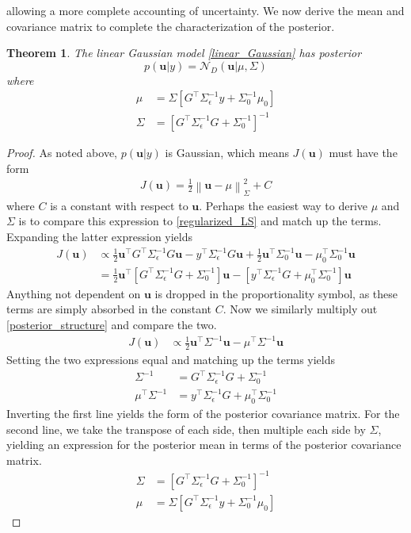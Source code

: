\documentclass[12pt]{article}
\newcommand{\bpar}{\mathbf{u}} %
\newcommand*{\norm}[1]{\left\lVert#1\right\rVert}
\newtheorem{thm}{Theorem}
\begin{document}
allowing a more complete accounting of uncertainty. We now derive the mean and covariance matrix to complete the characterization of the posterior. 
\begin{thm}
The linear Gaussian model \ref{linear_Gaussian} has posterior 
\[p(\bpar|y) = \mathcal{N}_D(\bpar|\mu, \Sigma)\]
where 
\begin{align} 
\mu &= \Sigma \left[G^{\top} \Sigma_{\epsilon}^{-1}y + \Sigma_0^{-1} \mu_0 \right] \\
\Sigma &= \left[G^{\top} \Sigma_{\epsilon}^{-1} G + \Sigma_0^{-1} \right]^{-1}
\end{align}
\end{thm}
\begin{proof} 
As noted above, $p(\bpar|y)$ is Gaussian, which means $J(\bpar)$ must have the form 
\begin{align}
J(\bpar) = \frac{1}{2} \norm{\bpar - \mu}^2_{\Sigma} + C \label{posterior_structure}
\end{align}
where $C$ is a constant with respect to $\bpar$. Perhaps the easiest way to derive $\mu$ and $\Sigma$ is to compare this expression to \ref{regularized_LS} and match up the terms. 
Expanding the latter expression yields 
\begin{align*}
J(\bpar) &\propto \frac{1}{2} \bpar^{\top} G^{\top} \Sigma_{\epsilon}^{-1} G\bpar - y^{\top} \Sigma_{\epsilon}^{-1} G\bpar + \frac{1}{2} \bpar^{\top} \Sigma_0^{-1} \bpar - \mu_0^{\top} \Sigma_0^{-1} \bpar \\ 
&= \frac{1}{2} \bpar^{\top} \left[G^{\top} \Sigma_\epsilon^{-1} G + \Sigma_0^{-1} \right] \bpar - \left[y^{\top} \Sigma_{\epsilon}^{-1} G + \mu_0^{\top} \Sigma_0^{-1} \right] \bpar
\end{align*}
Anything not dependent on $\bpar$ is dropped in the proportionality symbol, as these terms are simply absorbed in the constant $C$.  
Now we similarly multiply out \ref{posterior_structure} and compare the two. 
\begin{align*}
J(\bpar) &\propto \frac{1}{2} \bpar^{\top} \Sigma^{-1} \bpar - \mu^{\top} \Sigma^{-1} \bpar
\end{align*}
Setting the two expressions equal and matching up the terms yields
\begin{align*}
\Sigma^{-1} &= G^{\top} \Sigma_{\epsilon}^{-1} G + \Sigma_0^{-1} \\
\mu^{\top} \Sigma^{-1} &= y^{\top} \Sigma_{\epsilon}^{-1} G + \mu_0^{\top} \Sigma_0^{-1}
\end{align*}
Inverting the first line yields the form of the posterior covariance matrix. For the second line, we take the transpose of each side, then multiple 
each side by $\Sigma$, yielding an expression for the posterior mean in terms of the posterior covariance matrix. 
\begin{align*}
\Sigma &= \left[G^{\top} \Sigma_{\epsilon}^{-1} G + \Sigma_0^{-1} \right]^{-1} \\
\mu &= \Sigma \left[G^{\top} \Sigma_{\epsilon}^{-1}y + \Sigma_0^{-1} \mu_0 \right]
\end{align*}

\end{proof} 
\end{document}
